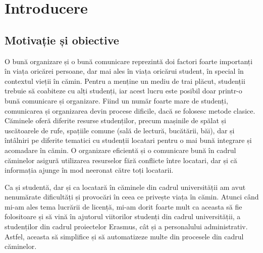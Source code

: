 \documentclass[12pt,a4paper]{report}
\theoremstyle{definition}
\theoremstyle{remark}
\begin{document}
\chapter{Introducere}
\section{Motivație și obiective}
\par O bună organizare și o bună comunicare reprezintă doi factori foarte importanți în viața oricărei persoane, dar mai ales în viața oricărui student, în special în contextul vieții în cămin. Pentru a menține un mediu de trai plăcut, studenții trebuie să coabiteze cu alți studenți, iar acest lucru este posibil doar printr-o bună comunicare și organizare. Fiind un număr foarte mare de studenți, comunicarea și organizarea devin procese dificile, dacă se folosesc metode clasice. Căminele oferă diferite resurse studenților, precum mașinile de spălat și uscătoarele de rufe, spațiile comune (sală de lectură, bucătării, băi), dar și întâlniri pe diferite tematici cu studenții locatari pentru o mai bună integrare și acomadare în cămin. O organizare eficientă și o comunicare bună în cadrul căminelor asigură  utilizarea resurselor fără conflicte între locatari, dar și că informația ajunge în mod neeronat către toți locatarii.

\par Ca și studentă, dar și ca locatară în căminele din cadrul universității am avut nenumărate dificultăți și provocări în ceea ce privește viața în cămin. Atunci când mi-am ales tema lucrării de licență, mi-am dorit foarte mult ca aceasta să fie folositoare și să vină în ajutorul viitorilor studenți din cadrul universității, a studenților din cadrul proiectelor Erasmus, cât și a personalului administrativ. Astfel, aceasta să simplifice și să automatizeze multe din procesele din cadrul căminelor.
\end{document}
